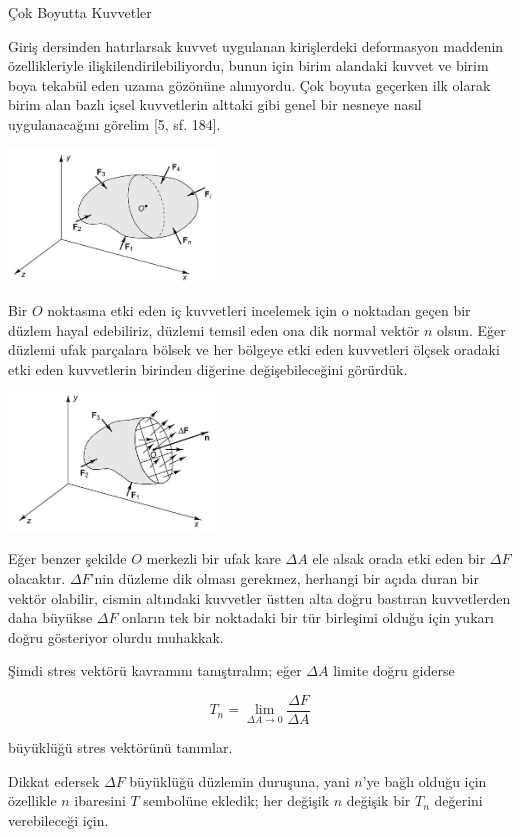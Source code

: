 \documentclass[12pt,fleqn]{article}\usepackage{../../common}
\begin{document}
Çok Boyutta Kuvvetler

Giriş dersinden hatırlarsak kuvvet uygulanan kirişlerdeki deformasyon maddenin
özellikleriyle ilişkilendirilebiliyordu, bunun için birim alandaki kuvvet ve
birim boya tekabül eden uzama gözönüne alınıyordu. Çok boyuta geçerken ilk
olarak birim alan bazlı içsel kuvvetlerin alttaki gibi genel bir nesneye nasıl
uygulanacağını görelim [5, sf. 184].

\includegraphics[width=15em]{phy_020_strs_02_16.jpg}

Bir $O$ noktasına etki eden iç kuvvetleri incelemek için o noktadan geçen bir
düzlem hayal edebiliriz, düzlemi temsil eden ona dik normal vektör $n$ olsun.
Eğer düzlemi ufak parçalara bölsek ve her bölgeye etki eden kuvvetleri ölçsek
oradaki etki eden kuvvetlerin birinden diğerine değişebileceğini görürdük.

\includegraphics[width=15em]{phy_020_strs_02_17.jpg}

Eğer benzer şekilde $O$ merkezli bir ufak kare $\Delta A$ ele alsak orada etki
eden bir $\Delta F$ olacaktır. $\Delta F$'nin düzleme dik olması gerekmez,
herhangi bir açıda duran bir vektör olabilir, cismin altındaki kuvvetler üstten
alta doğru bastıran kuvvetlerden daha büyükse $\Delta F$ onların tek bir
noktadaki bir tür birleşimi olduğu için yukarı doğru gösteriyor olurdu muhakkak.

Şimdi stres vektörü kavramını tanıştıralım; eğer $\Delta A$ limite doğru giderse

$$
T_n = \lim_{\Delta A \to 0} \frac{\Delta F}{\Delta A}
$$

büyüklüğü stres vektörünü tanımlar.

Dikkat edersek $\Delta F$ büyüklüğü düzlemin duruşuna, yani $n$'ye bağlı olduğu
için özellikle $n$ ibaresini $T$ sembolüne ekledik; her değişik $n$ değişik bir
$T_n$ değerini verebileceği için.
\end{document}
